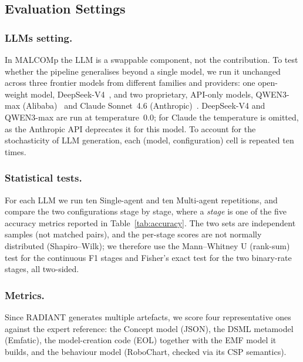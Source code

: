 


\subsection{Evaluation Settings}\label{sec:eval:settings}
\subsubsection{LLMs setting.}In MALCOMp the LLM is a swappable component, not the contribution.
To test whether the pipeline generalises beyond a single model, we run it unchanged across three frontier models from different families and providers: one open-weight model, DeepSeek-V4~\cite{liu2024deepseek_v3}, and two proprietary, API-only models, QWEN3-max (Alibaba)~\cite{yang2025qwen3technicalreport} and Claude Sonnet~4.6 (Anthropic)~\cite{anthropic2025claudesonnet}.
DeepSeek-V4 and QWEN3-max are run at temperature~0.0; for Claude the temperature is omitted, as the Anthropic API deprecates it for this model.
To account for the stochasticity of LLM generation, each (model, configuration) cell is repeated ten times.



\subsubsection{Statistical tests.}For each LLM we run ten Single-agent and ten Multi-agent repetitions, and compare the two configurations stage by stage, where a \emph{stage} is one of the five accuracy metrics reported in Table~\ref{tab:accuracy}.
The two sets are independent samples (not matched pairs), and the per-stage scores are not normally distributed (Shapiro--Wilk); we therefore use the Mann--Whitney U (rank-sum) test for the continuous F1 stages and Fisher's exact test for the two binary-rate stages, all two-sided.

\subsubsection{Metrics.}Since RADIANT generates multiple artefacts, we score four representative ones against the expert reference: the Concept model (JSON), the DSML metamodel (Emfatic), the model-creation code (EOL) together with the EMF model it builds, and the behaviour model (RoboChart, checked via its CSP semantics).

